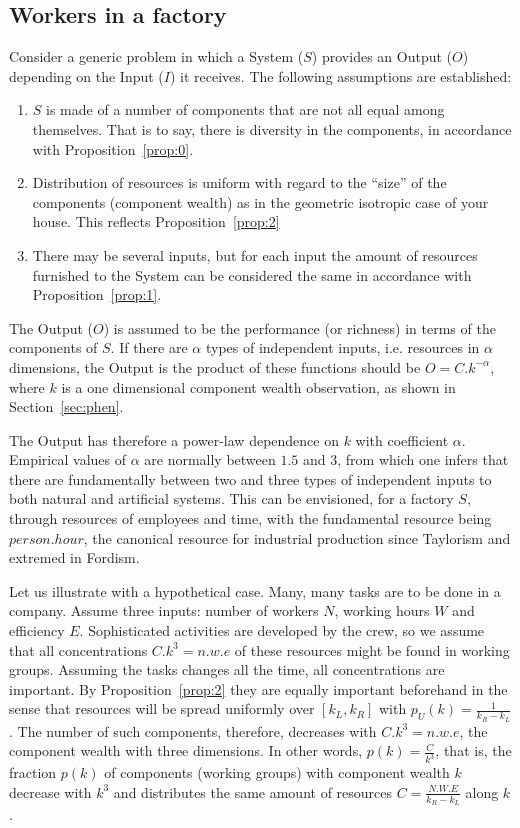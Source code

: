 \documentclass[a4paper, 11pt]{article} %
\begin{document}
\subsection{Workers in a factory}
Consider a generic problem in which a System ($S$) provides an Output ($O$) depending on the Input ($I$) it receives.
The following assumptions are established:
\begin{enumerate}
	\item $S$ is made of a number of components that are not all equal among themselves.
That is to say, there is diversity in the components, in accordance with Proposition~\ref{prop:0}. 
\item Distribution of resources is uniform with regard to the ``size'' of the components (component wealth) as in the geometric isotropic case of your house.
This reflects Proposition~\ref{prop:2}
\item There may be several inputs, but for each input the amount of resources furnished to the System can be considered the same 
	in accordance with Proposition~\ref{prop:1}.
\end{enumerate}

The Output ($O$)
is assumed to be the performance (or richness) in terms of the components of $S$.
If there are $\alpha$ types of independent inputs, i.e. resources in $\alpha$ dimensions,
the Output is the product of these functions should be
$O =C.k^{-\alpha}$, where $k$ is a one dimensional component wealth observation,
as shown in Section~\ref{sec:phen}. 

The Output has therefore a power-law dependence on $k$ with coefficient $\alpha$. 
Empirical values of $\alpha$
are normally between $1.5$ and $3$,
from which one infers that there are 
fundamentally between two and three types
of independent inputs to both natural and artificial systems.
This can be envisioned, for a factory $S$, through resources
of employees and time, with the fundamental resource being 
$person . hour$, the canonical resource for 
industrial production since Taylorism
and extremed in Fordism.

Let us illustrate with a hypothetical case.
Many, many tasks are to be done in a company.
Assume three inputs:
number of workers $N$, working hours $W$
and efficiency $E$.
Sophisticated activities are developed by the crew,
so we assume that all concentrations $C.k^3=n.w.e$
of these resources might be found in working groups.
Assuming the tasks changes all the time,
all concentrations are important.
By Proposition~\ref{prop:2} they are equally important beforehand
in the sense that 
resources will be spread uniformly over $[k_L,k_R]$
with $p_U(k)=\frac{1}{k_R-k_L}$.
The number of such components, therefore,
decreases with $C.k^3=n.w.e$, the component wealth with three dimensions.
In other words,
$p(k)=\frac{C}{k^3}$, that is,
the fraction $p(k)$ of components (working groups) with component wealth $k$
decrease with $k^3$ and distributes the same
amount of resources $C=\frac{N.W.E}{k_R-k_L}$ along $k$.
\end{document}
